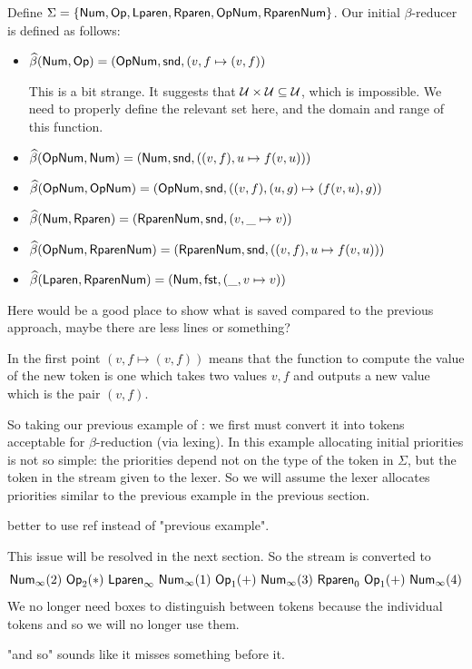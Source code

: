 \documentclass{llncs}
\newcommand{\yoni}[1]{{\begin{mdframed}[linecolor=red]{\color{red}#1}\end{mdframed}}}
\begin{document}
\begin{example}

    Define $\Sigma=\set{\NUM,\OP,\LPAREN,\RPAREN,\OP\NUM,\RPAREN\NUM}$.
    Our initial $\beta$-reducer is defined as follows:
    \begin{itemize}
        \item $\widehat\beta(\mathsf{Num},\mathsf{Op})=(\mathsf{Op}\mathsf{Num},\mathsf{snd},(v,f\mapsto(v,f))$
\yoni{This is a bit strange. It suggests that $\mathcal U\times \mathcal U \subseteq \mathcal U$, which is impossible. We need to properly define the relevant set here, and the domain and range of this function.}
        \item $\widehat\beta(\mathsf{Op}\mathsf{Num},\mathsf{Num})=(\mathsf{Num},\mathsf{snd},((v,f),u\mapsto f(v,u)))$
        \item $\widehat\beta(\mathsf{Op}\mathsf{Num},\mathsf{Op}\mathsf{Num})=(\mathsf{Op}\mathsf{Num},\mathsf{snd},((v,f),(u,g)\mapsto (f(v,u),g))$
        \item $\widehat\beta(\mathsf{Num},\mathsf{Rparen})=(\mathsf{Rparen}\mathsf{Num},\mathsf{snd},(v,\_\mapsto v))$
        \item $\widehat\beta(\mathsf{Op}\mathsf{Num},\mathsf{Rparen}\mathsf{Num})=(\mathsf{Rparen}\mathsf{Num},\mathsf{snd},((v,f),u\mapsto f(v,u)))$
        \item $\widehat\beta(\mathsf{Lparen},\mathsf{Rparen}\mathsf{Num})=(\mathsf{Num},\mathsf{fst},(\_,v\mapsto v))$
    \end{itemize}
\yoni{Here would be a good place to show what is saved compared to the previous approach, maybe there are less lines or something?}
    In the first point $(v,f\mapsto(v,f))$ means that the function to compute the value of the new token is one which takes two values $v,f$ and outputs a new value which is the pair $(v,f)$.
    
    So taking our previous example of : we first must convert it into tokens acceptable for $\beta$-reduction (via lexing).
    In this example allocating initial priorities is not so simple: the priorities depend not on the type of the token in $\Sigma$, but the token in the stream given to the lexer.
    So we will assume the lexer allocates priorities similar to the previous example in the previous section.
    \yoni{better to use ref instead of "previous example".}
    This issue will be resolved in the next section.
    So the stream is converted to
    \[ \NUM_\infty(2)\ \OP_2(*)\ \LPAREN_\infty\ \NUM_\infty(1)\ \OP_1(+)\ \NUM_\infty(3)\ \RPAREN_0\ \OP_1(+)\ \NUM_\infty(4) \]
    We no longer need boxes to distinguish between tokens because the individual tokens and so we will no longer use them.
    \yoni{"and so" sounds like it misses something before it.}


\end{example}
\end{document}
